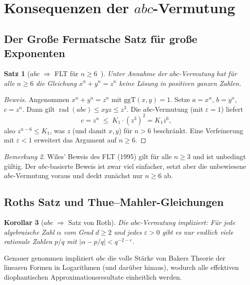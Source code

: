 \documentclass[12pt,a4paper]{article}
\newtheorem{theorem}{Satz}[section]
\newtheorem{corollary}[theorem]{Korollar}
\theoremstyle{remark}
\newtheorem{remark}[theorem]{Bemerkung}
\newcommand{\ggT}{\mathrm{ggT}}
\begin{document}
\section{Konsequenzen der $abc$-Vermutung}

\subsection{Der Große Fermatsche Satz für große Exponenten}

\begin{theorem}[$abc$ $\Rightarrow$ FLT für $n \geq 6$~\cite{Granville1990}]
  Unter Annahme der $abc$-Vermutung hat für alle $n \geq 6$ die Gleichung
  $x^n + y^n = z^n$ keine Lösung in positiven ganzen Zahlen.
\end{theorem}

\begin{proof}[Beweis]
  Angenommen $x^n + y^n = z^n$ mit $\ggT(x,y)=1$. Setze $a=x^n$, $b=y^n$, $c=z^n$.
  Dann gilt $\operatorname{rad}(abc) \leq xyz \leq z^3$. Die $abc$-Vermutung (mit
  $\varepsilon=1$) liefert
  \[
    c = z^n \;\leq\; K_1 \cdot (z^3)^2 = K_1 z^6,
  \]
  also $z^{n-6}\leq K_1$, was $z$ (und damit $x, y$) für $n>6$ beschränkt. Eine
  Verfeinerung mit $\varepsilon < 1$ erweitert das Argument auf $n\geq 6$.
\end{proof}

\begin{remark}
  Wiles' Beweis des FLT (1995) gilt für alle $n\geq 3$ und ist unbedingt gültig.
  Der $abc$-basierte Beweis ist zwar viel einfacher, setzt aber die unbewiesene
  $abc$-Vermutung voraus und deckt zunächst nur $n\geq 6$ ab.
\end{remark}

\subsection{Roths Satz und Thue--Mahler-Gleichungen}

\begin{corollary}[$abc$ $\Rightarrow$ Satz von Roth]
  Die $abc$-Vermutung impliziert: Für jede algebraische Zahl $\alpha$ vom Grad $d\geq 2$
  und jedes $\varepsilon>0$ gibt es nur endlich viele rationale Zahlen $p/q$ mit
  $|\alpha - p/q| < q^{-2-\varepsilon}$.
\end{corollary}

Genauer genommen impliziert $abc$ die volle Stärke von Bakers Theorie der linearen Formen
in Logarithmen (und darüber hinaus), wodurch alle effektiven diophantischen
Approximationsresultate einheitlich werden.
\end{document}
